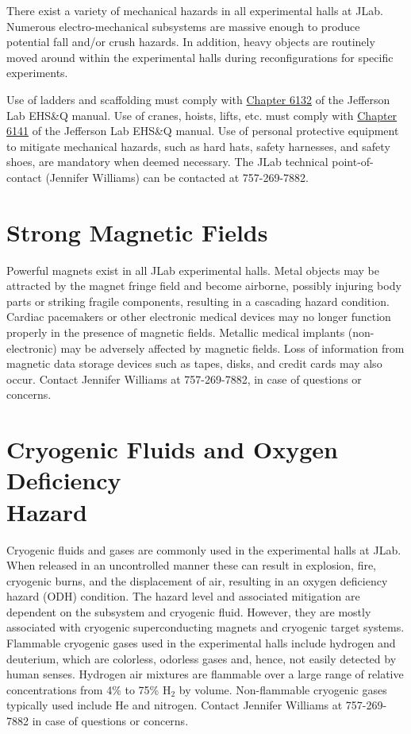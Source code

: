 \documentclass[12pt]{report}
\begin{document}
There exist a variety of mechanical hazards in all experimental halls at JLab. Numerous 
electro-mechanical subsystems are massive enough to produce potential fall and/or crush 
hazards.  In addition, heavy objects are routinely moved around within the experimental 
halls during reconfigurations for specific experiments. 

Use of ladders and scaffolding must comply with 
\href{http://www.jlab.org/ehs/ehsmanual/manual/6132.html}{Chapter 6132} of the Jefferson 
Lab EHS\&Q manual. Use of cranes, hoists, lifts, etc. must comply with
\href{http://www.jlab.org/ehs/ehsmanual/manual/6141.html}{Chapter 6141} of the Jefferson
Lab EHS\&Q manual. Use of personal protective equipment to mitigate mechanical hazards, 
such as hard hats, safety harnesses, and safety shoes, are mandatory when deemed necessary.
The JLab technical point-of-contact (Jennifer Williams) can be contacted at 757-269-7882.

\section{Strong Magnetic Fields}

Powerful magnets exist in all JLab experimental halls. Metal objects may be attracted 
by the magnet fringe field and become airborne, possibly injuring body parts or striking 
fragile components, resulting in a cascading hazard condition. Cardiac pacemakers or other 
electronic medical devices may no longer function properly in the presence of magnetic 
fields. Metallic medical implants (non-electronic) may be adversely affected by magnetic 
fields. Loss of information from magnetic data storage devices such as tapes, disks, and 
credit cards may also occur. Contact Jennifer Williams at 757-269-7882, in case of questions
or concerns.

\section{Cryogenic Fluids and Oxygen Deficiency \\Hazard}

Cryogenic fluids and gases are commonly used in the experimental halls at JLab. When 
released in an uncontrolled manner these can result in explosion, fire, cryogenic burns, 
and the displacement of air, resulting in an oxygen deficiency hazard (ODH) condition. 
The hazard level and associated mitigation are dependent on the subsystem and cryogenic 
fluid. However, they are mostly associated with cryogenic superconducting magnets and 
cryogenic target systems. Flammable cryogenic gases used in the experimental halls 
include hydrogen and deuterium, which are colorless, odorless gases and, hence, not easily 
detected by human senses. Hydrogen air mixtures are flammable over a large range of relative 
concentrations from 4\% to 75\% H$_2$ by volume. Non-flammable cryogenic gases typically 
used include He and nitrogen. Contact Jennifer Williams at 757-269-7882 in case of questions or concerns.
\end{document}
